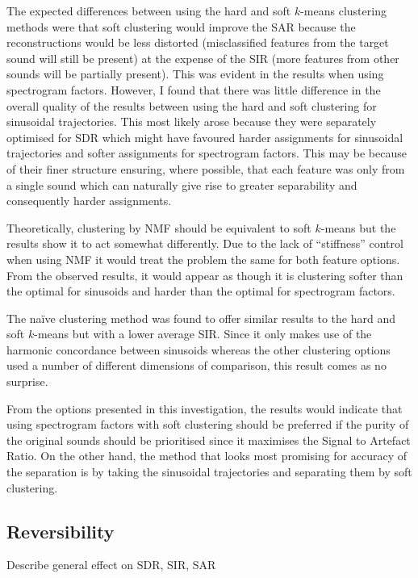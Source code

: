 \documentclass[10pt,twoside,a4paper]{report}
\begin{document}
The expected differences between using the hard and soft $ k $-means clustering methods were that soft clustering would improve the SAR because the reconstructions would be less distorted (misclassified features from the target sound will still be present) at the expense of the SIR (more features from other sounds will be partially present). This was evident in the results when using spectrogram factors. However, I found that there was little difference in the overall quality of the results between using the hard and soft clustering for sinusoidal trajectories. This most likely arose because they were separately optimised for SDR which might have favoured harder assignments for sinusoidal trajectories and softer assignments for spectrogram factors. This may be because of their finer structure ensuring, where possible, that each feature was only from a single sound which can naturally give rise to greater separability and consequently harder assignments.

Theoretically, clustering by NMF should be equivalent to soft $ k $-means but the results show it to act somewhat differently. Due to the lack of ``stiffness'' control when using NMF it would treat the problem the same for both feature options. From the observed results, it would appear as though it is clustering softer than the optimal for sinusoids and harder than the optimal for spectrogram factors.

The na\"{i}ve clustering method was found to offer similar results to the hard and soft $ k $-means but with a lower average SIR. Since it only makes use of the harmonic concordance between sinusoids whereas the other clustering options used a number of different dimensions of comparison, this result comes as no surprise.

From the options presented in this investigation, the results would indicate that using spectrogram factors with soft clustering should be preferred if the purity of the original sounds should be prioritised since it maximises the Signal to Artefact Ratio. On the other hand, the method that looks most promising for accuracy of the separation is by taking the sinusoidal trajectories and separating them by soft clustering.

\subsection{Reversibility}

Describe general effect on SDR, SIR, SAR
\end{document}

